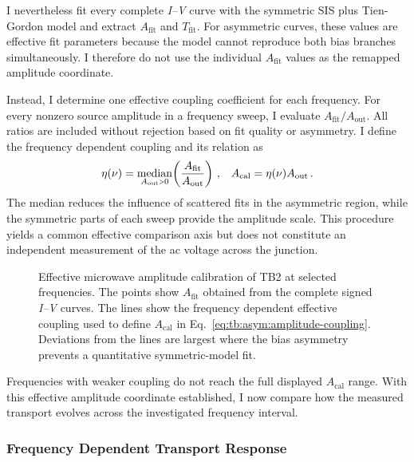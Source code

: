         I nevertheless fit every complete \textit{I--V} curve with the symmetric SIS plus Tien-Gordon model and extract $A_\mathrm{fit}$ and $T_\mathrm{fit}$. For asymmetric curves, these values are effective fit parameters because the model cannot reproduce both bias branches simultaneously. I therefore do not use the individual $A_\mathrm{fit}$ values as the remapped amplitude coordinate.

        Instead, I determine one effective coupling coefficient for each frequency. For every nonzero source amplitude in a frequency sweep, I evaluate $A_\mathrm{fit}/A_\mathrm{out}$. All ratios are included without rejection based on fit quality or asymmetry. I define the frequency dependent coupling and its relation as
        \begin{align}
            \eta(\nu)=\operatorname*{median}_{A_\mathrm{out}\sgt{}0}\!\left(\frac{A_\mathrm{fit}}{A_\mathrm{out}}\right)\,, &&
            A_\mathrm{cal}=\eta(\nu)A_\mathrm{out}\,.
            \label{eq:tb:asym:amplitude-coupling}
        \end{align}
        The median reduces the influence of scattered fits in the asymmetric region, while the symmetric parts of each sweep provide the amplitude scale. This procedure yields a common effective comparison axis but does not constitute an independent measurement of the ac voltage across the junction.

        \begin{figure}[t]
            \centering
            \caption{
                Effective microwave amplitude calibration of TB2 at selected frequencies. The points show $A_\mathrm{fit}$ obtained from the complete signed \textit{I--V} curves. The lines show the frequency dependent effective coupling used to define $A_\mathrm{cal}$ in Eq.~\eqref{eq:tb:asym:amplitude-coupling}. Deviations from the lines are largest where the bias asymmetry prevents a quantitative symmetric-model fit.
            }
            \label{fig:tb:asym:control-Afit_Aout}
        \end{figure}

        Frequencies with weaker coupling do not reach the full displayed $A_\mathrm{cal}$ range. With this effective amplitude coordinate established, I now compare how the measured transport evolves across the investigated frequency interval.

    \subsubsection*{Frequency Dependent Transport Response}
    \label{subsec:tb:asym:transport}

